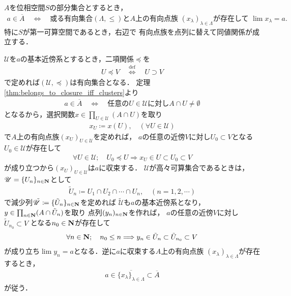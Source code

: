 	\begin{screen}
		\begin{thm}[閉集合は有向点族の極限点集合]
			$A$を位相空間$S$の部分集合とするとき，
			\begin{align}
				a \in \overline{A} \quad \Longleftrightarrow \quad
				\mbox{或る有向集合$(\Lambda,\leq)$と$A$上の有向点族
				$(x_\lambda)_{\lambda \in \Lambda}$が存在して
				$\lim x_\lambda = a$}.
			\end{align}
			特に$S$が第一可算空間であるとき，右辺で
			有向点族を点列に替えて同値関係が成立する．
		\end{thm}
	\end{screen}
	
	\begin{prf}
		$\mathscr{U}$を$a$の基本近傍系とするとき，二項関係$\preceq$を
		\begin{align}
			U \preceq V \quad \overset{\mathrm{def}}{\Longleftrightarrow} \quad
			U \supset V
		\end{align}
		で定めれば$(\mathscr{U},\preceq)$は有向集合となる．
		定理\ref{thm:belongs_to_closure_iff_clusters}より
		\begin{align}
			a \in \overline{A} \quad \Longleftrightarrow \quad
			\mbox{任意の$U \in \mathscr{U}$に対し$A \cap U \neq \emptyset$}
		\end{align}
		となるから，選択関数$x \in \prod_{U \in \mathscr{U}} (A \cap U)$を取り
		\begin{align}
			x_U \coloneqq x(U), \quad (\forall U \in \mathscr{U})
		\end{align}
		で$A$上の有向点族$(x_U)_{U \in \mathscr{U}}$を定めれば，
		$a$の任意の近傍$V$に対し$U_0 \subset V$となる$U_0 \in \mathscr{U}$が存在して
		\begin{align}
			\forall U \in \mathscr{U};\quad
			U_0 \preceq U \Longrightarrow x_U \in U \subset U_0 \subset V
		\end{align}
		が成り立つから$(x_U)_{U \in \mathscr{U}}$は$a$に収束する．
		$\mathscr{U}$が高々可算集合であるときは，$\mathscr{U} = \{U_n\}_{n \in \mathbf{N}}$として
		\begin{align}
			\tilde{U}_n \coloneqq U_1 \cap U_2 \cap \cdots \cap U_n,
			\quad (n=1,2,\cdots) 
		\end{align}
		で減少列$\tilde{\mathscr{U}} \coloneqq \{\tilde{U}_n\}_{n \in \mathbf{N}}$を定めれば
		$\tilde{\mathscr{U}}$も$a$の基本近傍系となり，
		$y \in \prod_{n \in \mathbf{N}}(A \cap \tilde{U}_n)$を取り
		点列$(y_n)_{n \in \mathbf{N}}$を作れば，
		$a$の任意の近傍$V$に対し$\tilde{U}_{n_0} \subset V$
		となる$n_0 \in \mathbf{N}$が存在して
		\begin{align}
			\forall n \in \mathbf{N};\quad
			n_0 \leq n \Longrightarrow y_n \in \tilde{U}_n \subset \tilde{U}_{n_0}
			\subset V
		\end{align}
		が成り立ち$\lim y_n = a$となる．逆に$a$に収束する$A$上の有向点族
		$(x_\lambda)_{\lambda \in \Lambda}$が存在するとき，
		\begin{align}
			a \in \overline{\{x_\lambda\}_{\lambda \in \Lambda}} 
			\subset \overline{A}
		\end{align}
		が従う．
		\QED
	\end{prf}
	
